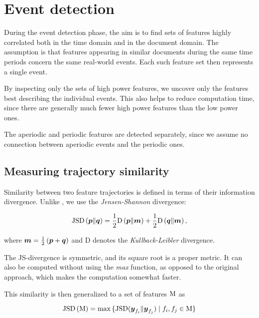 \section{Event detection}

During the event detection phase, the aim is to find sets of features highly correlated both in the time domain and in the document domain. The assumption is that features appearing in similar documents during the same time periods concern the same real-world events. Each such feature set then represents a single event.

By inspecting only the sets of high power features, we uncover only the features best describing the individual events. This also helps to reduce computation time, since there are generally much fewer high power features than the low power ones.

The aperiodic and periodic features are detected separately, since we assume no connection between aperiodic events and the periodic ones.


\subsection{Measuring trajectory similarity}

Similarity between two feature trajectories is defined in terms of their information divergence. Unlike \cite{event-detection}, we use the \textit{Jensen-Shannon} divergence:

\begin{equation*}
	\featsim \left( \vect{p} \| \vect{q} \right) = \frac{1}{2} \text{D} \left( \vect{p} \| \vect{m} \right) + \frac{1}{2} \text{D} \left( \vect{q} \| \vect{m} \right),
\end{equation*}

where $\vect{m} = \frac{1}{2} \left( \vect{p} + \vect{q} \right)$ and D denotes the \textit{Kullback-Leibler} divergence.

The JS-divergence is symmetric, and its square root is a proper metric. It can also be computed without using the \textit{max} function, as opposed to the original approach, which makes the computation somewhat faster.

This similarity is then generalized to a set of features $\text{M}$ as

\begin{equation}
	\featsim \left( \featset \right) = \max{ \{ \featsim ( \vect{y}_{f_{i}} \| \vect{y}_{f_{j}} ) \mid f_{i}, f_{j} \in \featset \} }
\end{equation}


